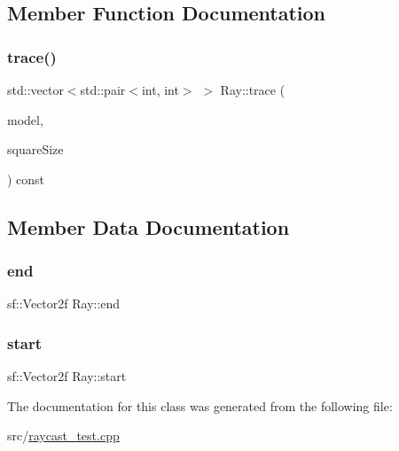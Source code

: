 \subsection{Member Function Documentation}
\mbox{\label{classRay_a991b8c09b3b6968dfe01d6e664171df1}} 
\subsubsection{\texorpdfstring{trace()}{trace()}}
{\footnotesize\ttfamily std\+::vector$<$std\+::pair$<$int, int$>$ $>$ Ray\+::trace (\begin{DoxyParamCaption}\item[{const \hyperlink{classGridModel}{Grid\+Model} \&}]{model,  }\item[{int}]{square\+Size }\end{DoxyParamCaption}) const\hspace{0.3cm}{\ttfamily [inline]}}



\subsection{Member Data Documentation}
\mbox{\label{classRay_a636a32ba4f0f26b1cf072641c88725b7}} 
\subsubsection{\texorpdfstring{end}{end}}
{\footnotesize\ttfamily sf\+::\+Vector2f Ray\+::end}

\mbox{\label{classRay_aa18b535335797f17f6d88e184d6cb7ca}} 
\subsubsection{\texorpdfstring{start}{start}}
{\footnotesize\ttfamily sf\+::\+Vector2f Ray\+::start}



The documentation for this class was generated from the following file\+:\begin{DoxyCompactItemize}
\item 
src/\hyperlink{raycast__test_8cpp}{raycast\+\_\+test.\+cpp}\end{DoxyCompactItemize}
